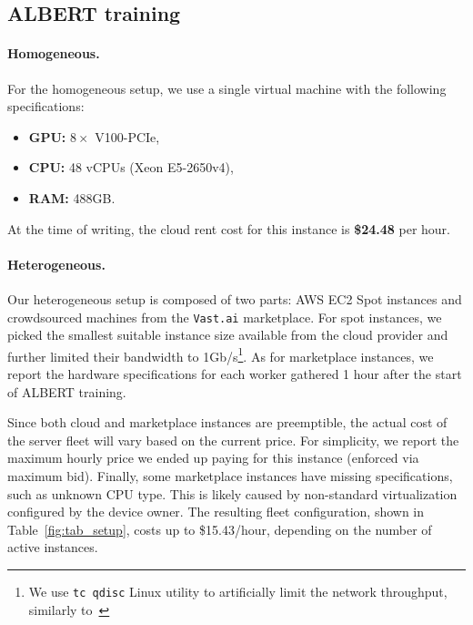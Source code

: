 \subsection{ALBERT training}\label{sect:detailed_setup_albert}


\paragraph{Homogeneous.}For the homogeneous setup, we use a single virtual machine with the following specifications:
\begin{itemize}
    \item \textbf{GPU:} $8{\times}$ V100-PCIe,
    \item \textbf{CPU:} 48 vCPUs (Xeon E5-2650v4),
    \item \textbf{RAM:} 488GB.
\end{itemize}

At the time of writing, the cloud rent cost for this instance is \textbf{\$24.48} per hour.

\paragraph{Heterogeneous.}Our heterogeneous setup is composed of two parts: AWS EC2 Spot instances and crowdsourced machines from the \texttt{Vast.ai} marketplace. For spot instances, we picked the smallest suitable instance size available from the cloud provider and further limited their bandwidth to 1Gb/s\footnote{We use \texttt{tc qdisc} Linux utility to artificially limit the network throughput, similarly to~\cite{MLSYS2019_d09bf415}}. As for marketplace instances, we report the hardware specifications for each worker gathered 1 hour after the start of ALBERT training.

Since both cloud and marketplace instances are preemptible, the actual cost of the server fleet will vary based on the current price. For simplicity, we report the maximum hourly price we ended up paying for this instance (enforced via maximum bid). Finally, some marketplace instances have missing specifications, such as unknown CPU type. This is likely caused by non-standard virtualization configured by the device owner. The resulting fleet configuration, shown in Table~\ref{fig:tab_setup}, costs up to \$15.43/hour, depending on the number of active instances.

